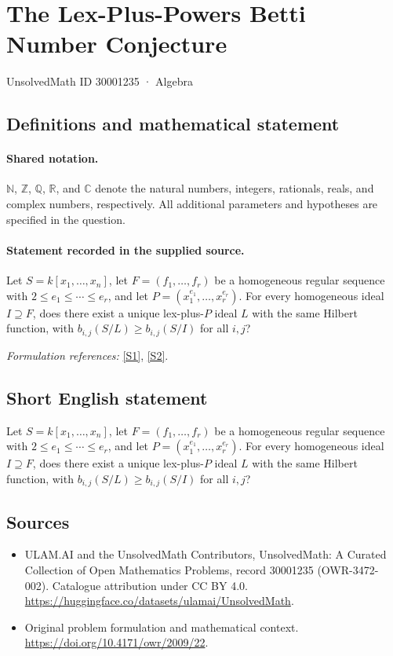 \documentclass[11pt]{article}
\newcommand{\sref}[2]{\hyperlink{source:#1:#2}{[S#2]}}
\begin{document}
\setcounter{section}{30001234}
\section{The Lex-Plus-Powers Betti Number Conjecture}\label{30001235}
{\small UnsolvedMath ID 30001235 · Algebra}
\subsection{Definitions and mathematical statement}

\paragraph{Shared notation.}$\mathbb N$, $\mathbb Z$, $\mathbb Q$, $\mathbb R$, and $\mathbb C$ denote the natural numbers, integers, rationals, reals, and complex numbers, respectively. All additional parameters and hypotheses are specified in the question.


\paragraph{Statement recorded in the supplied source.}
Let $S=k[x_1,\ldots,x_n]$, let $F=(f_1,\ldots,f_r)$ be a homogeneous regular sequence with $2\leq e_1\leq\cdots\leq e_r$, and let $P=(x_1^{e_1},\ldots,x_r^{e_r})$. For every homogeneous ideal $I\supseteq F$, does there exist a unique lex-plus-$P$ ideal $L$ with the same Hilbert function, with $b_{i,j}(S/L)\geq b_{i,j}(S/I)$ for all $i,j$?
\par\smallskip\textit{Formulation references:} \sref{30001235}{1}, \sref{30001235}{2}.
\subsection{Short English statement}
Let $S=k[x_1,\ldots,x_n]$, let $F=(f_1,\ldots,f_r)$ be a homogeneous regular sequence with $2\leq e_1\leq\cdots\leq e_r$, and let $P=(x_1^{e_1},\ldots,x_r^{e_r})$. For every homogeneous ideal $I\supseteq F$, does there exist a unique lex-plus-$P$ ideal $L$ with the same Hilbert function, with $b_{i,j}(S/L)\geq b_{i,j}(S/I)$ for all $i,j$?
\subsection{Sources}
\begin{itemize}
\item[\hypertarget{source:30001235:1}{S1}] ULAM.AI and the UnsolvedMath Contributors, UnsolvedMath: A Curated Collection of Open Mathematics Problems, record 30001235 (OWR-3472-002). Catalogue attribution under CC BY 4.0.
\url{https://huggingface.co/datasets/ulamai/UnsolvedMath}.
\item[\hypertarget{source:30001235:2}{S2}] Original problem formulation and mathematical context.
\url{https://doi.org/10.4171/owr/2009/22}.
\end{itemize}
\label{end:30001235}
\end{document}
